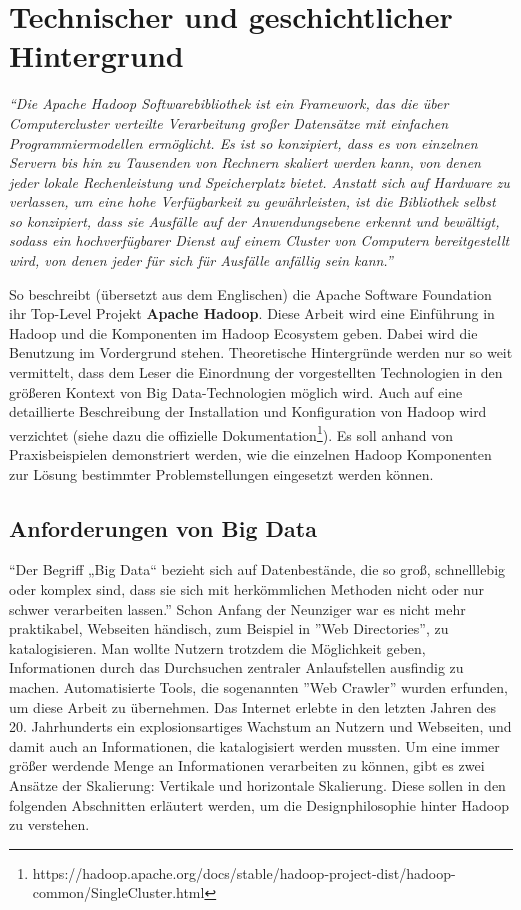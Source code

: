 \chapter{Technischer und geschichtlicher Hintergrund}
\textit{``Die Apache Hadoop Softwarebibliothek ist ein Framework, das die über Computercluster verteilte Verarbeitung großer Datensätze mit einfachen Programmiermodellen ermöglicht. Es ist so konzipiert, dass es von einzelnen Servern bis hin zu Tausenden von Rechnern skaliert werden kann, von denen jeder lokale Rechenleistung und Speicherplatz bietet. Anstatt sich auf Hardware zu verlassen, um eine hohe Verfügbarkeit zu gewährleisten, ist die Bibliothek selbst so konzipiert, dass sie Ausfälle auf der Anwendungsebene erkennt und bewältigt, sodass ein hochverfügbarer Dienst auf einem Cluster von Computern bereitgestellt wird, von denen jeder für sich für Ausfälle anfällig sein kann.''}\cite{noauthor_apache_nodate}
\par
So beschreibt (übersetzt aus dem Englischen) die Apache Software Foundation ihr Top-Level Projekt \textbf{Apache Hadoop}. Diese Arbeit wird eine Einführung in Hadoop und die Komponenten im Hadoop Ecosystem geben. Dabei wird die Benutzung im Vordergrund stehen. Theoretische Hintergründe werden nur so weit vermittelt, dass dem Leser die Einordnung der vorgestellten Technologien in den größeren Kontext von Big Data-Technologien möglich wird. Auch auf eine detaillierte Beschreibung der Installation und Konfiguration von Hadoop wird verzichtet (siehe dazu die offizielle Dokumentation\footnote{https://hadoop.apache.org/docs/stable/hadoop-project-dist/hadoop-common/SingleCluster.html}). Es soll anhand von Praxisbeispielen demonstriert werden, wie die einzelnen Hadoop Komponenten zur Lösung bestimmter Problemstellungen eingesetzt werden können. 

\section{Anforderungen von Big Data}
``Der Begriff „Big Data“ bezieht sich auf Datenbestände, die so groß, schnelllebig oder komplex sind, dass sie sich mit herkömmlichen Methoden nicht oder nur schwer verarbeiten lassen.''\cite{noauthor_big_nodate}
Schon Anfang der Neunziger war es nicht mehr praktikabel, Webseiten händisch, zum Beispiel in ''Web Directories'', zu katalogisieren. Man wollte Nutzern trotzdem die Möglichkeit geben, Informationen durch das Durchsuchen zentraler Anlaufstellen ausfindig zu machen. Automatisierte Tools, die sogenannten ''Web Crawler'' wurden erfunden, um diese Arbeit zu übernehmen.\cite{griffiths_search_2007}
Das Internet erlebte in den letzten Jahren des 20. Jahrhunderts ein explosionsartiges Wachstum an Nutzern und Webseiten, und damit auch an Informationen, die katalogisiert werden mussten.\cite{zakon_hobbes_2018} 
Um eine immer größer werdende Menge an Informationen verarbeiten zu können, gibt es zwei Ansätze der Skalierung: Vertikale und horizontale Skalierung. Diese sollen in den folgenden Abschnitten erläutert werden, um die Designphilosophie hinter Hadoop zu verstehen.

